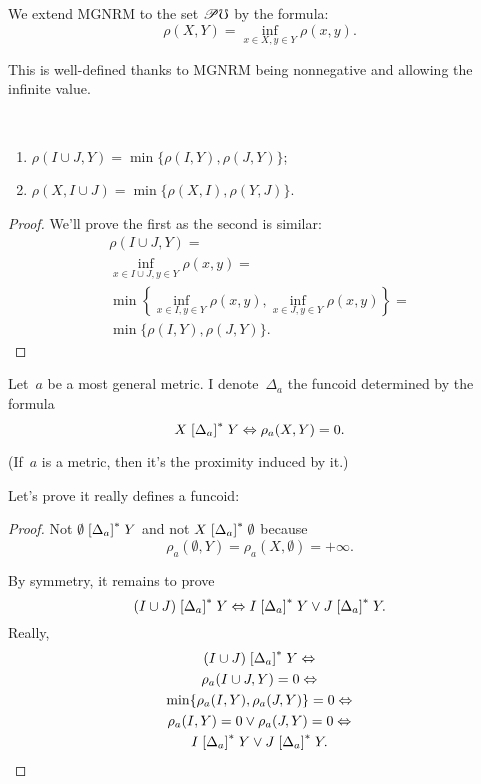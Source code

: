 \begin{defn}
We extend MGNRM to the set $\mathscr{P}\mho$ by the formula:
\[ \rho(X,Y) = \inf_{x\in X,y\in Y}\rho(x,y). \]
\end{defn}

\begin{rem}
This is well-defined thanks to MGNRM being nonnegative and allowing the infinite value.
\end{rem}

\begin{prop}
~
\begin{enumerate}
\item $\rho(I\cup J,Y) = \min\{\rho(I,Y), \rho(J,Y)\}$;
\item $\rho(X,I\cup J) = \min\{\rho(X,I), \rho(Y,J)\}$.
\end{enumerate}
\end{prop}

\begin{proof}
We'll prove the first as the second is similar:
\begin{multline*}
\rho(I\cup J,Y) = \\
\inf_{x\in I\cup J,y\in Y}\rho(x,y) = \\
\min\left\{\inf_{x\in I,y\in Y}\rho(x,y), \inf_{x\in J,y\in Y}\rho(x,y)\right\} = \\
\min\{\rho(I,Y), \rho(J,Y)\}.
\end{multline*}
\end{proof}

Let~$a$ be a most general metric. I denote~$\Delta_a$ the funcoid determined by the formula
\[
X\mathrel{\left[\Delta_a\right]^{\ast}}Y \Leftrightarrow \rho_a(X,Y)=0.
\]

(If~$a$ is a metric, then it's the proximity induced by it.)

Let's prove it really defines a funcoid:

\begin{proof}
Not $\emptyset\mathrel{\left[\Delta_a\right]^{\ast}}Y$ and not $X\mathrel{\left[\Delta_a\right]^{\ast}}\emptyset$ because \[ \rho_{a}(\emptyset,Y)=\rho_{a}(X,\emptyset)=+\infty. \]

By symmetry, it remains to prove
\[ (I\cup J)\mathrel{\left[\Delta_a\right]^{\ast}}Y \Leftrightarrow
I\mathrel{\left[\Delta_a\right]^{\ast}}Y \lor J\mathrel{\left[\Delta_a\right]^{\ast}}Y. \]
Really,
\begin{multline*}
(I\cup J)\mathrel{\left[\Delta_a\right]^{\ast}}Y \Leftrightarrow \\
\rho_a(I\cup J,Y)=0 \Leftrightarrow \\
\min\{\rho_a(I,Y),\rho_a(J,Y)\}=0 \Leftrightarrow \\
\rho_a(I,Y)=0\lor\rho_a(J,Y)=0 \Leftrightarrow \\
I\mathrel{\left[\Delta_a\right]^{\ast}}Y \lor J\mathrel{\left[\Delta_a\right]^{\ast}}Y.
\end{multline*}
\end{proof}

